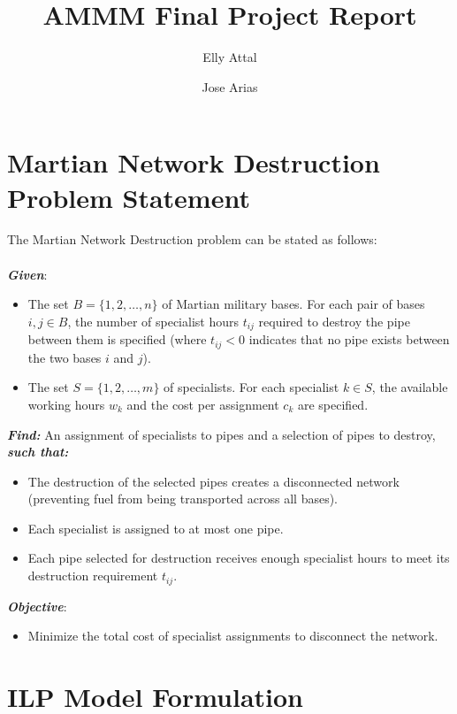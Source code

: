 \documentclass{article}
\title{\textbf{AMMM Final Project Report}}
\author[1]{Elly Attal}
\author[2]{Jose Arias}
\affil[1]{MIRI \href{mailto:@estudiantat.upc.edu}{elly.attal@estudiantat.upc.edu}}
\affil[2]{MIRI \href{mailto:@estudiantat.upc.edu}{jose.ricardo.arias@estudiantat.upc.edu}}
\begin{document}
\maketitle


\tableofcontents

\newpage

\section{Martian Network Destruction Problem Statement}

The Martian Network Destruction problem can be stated as follows:\\
\\
\textbf{\textit{Given}}:
\begin{itemize}
    \item The set $B = \{1, 2, \ldots, n\}$ of Martian military bases. For each pair of bases $i, j \in B$, the number of specialist hours $t_{ij}$ required to destroy the pipe between them is specified (where $t_{ij} < 0$ indicates that no pipe exists between the two bases $i$ and $j$).

    \item The set $S = \{1, 2, \ldots, m\}$ of specialists. For each specialist $k \in S$, the available working hours $w_k$ and the cost per assignment $c_k$ are specified.
\end{itemize}

\textbf{\textit{Find:}} An assignment of specialists to pipes and a selection of pipes to destroy, \textbf{\textit{such that:}}
\begin{itemize}
    \item The destruction of the selected pipes creates a disconnected network (preventing fuel from being transported across all bases).

    \item Each specialist is assigned to at most one pipe.

    \item Each pipe selected for destruction receives enough specialist hours to meet its destruction requirement $t_{ij}$.
\end{itemize}

\textbf{\textit{Objective}}:
\begin{itemize}
    \item Minimize the total cost of specialist assignments to disconnect the network.
\end{itemize}


\section{ILP Model Formulation}
\end{document}
